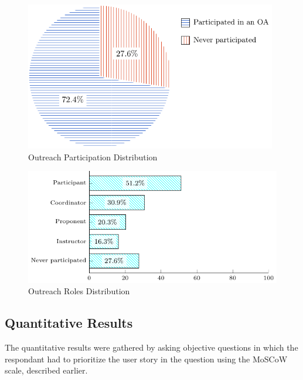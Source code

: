 \begin{figure}[!htb]
  \caption{Outreach Participation Distribution}\label{fig:outreach-participation}
  \begin{center}
    \includegraphics[width=11cm]{img/5-outreach-participation.pdf}
  \end{center}
\end{figure}

\begin{figure}[!htb]
  \caption{Outreach Roles Distribution}\label{fig:outreach-roles}
  \begin{center}
    \includegraphics[width=13cm]{img/5-outreach-roles.pdf}
  \end{center}
\end{figure}

\subsection{Quantitative Results}\label{sec:survey-quant}

The quantitative results were gathered by asking objective questions in which the respondant had to prioritize the user story in the question using the MoSCoW scale, described earlier.

